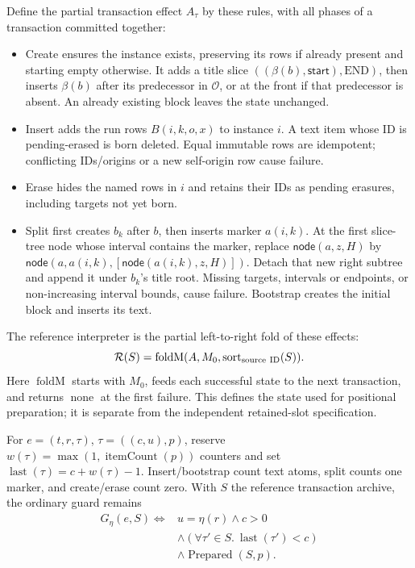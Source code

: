 Define the partial transaction effect $A_\tau$ by these rules, with all phases
of a transaction committed together:
\begin{itemize}
\item Create ensures the instance exists, preserving its rows if already
present and starting empty otherwise. It adds a title slice
  $((\beta(b),\mathsf{start}),\mathrm{END})$, then inserts $\beta(b)$ after its
  predecessor in $\mathcal O$, or at the front if that predecessor is absent.
  An already existing block leaves the state unchanged.
\item Insert adds the run rows $B(i,k,o,x)$ to instance $i$. A text item whose
  ID is pending-erased is born deleted. Equal immutable rows are idempotent;
  conflicting IDs/origins or a new self-origin row cause failure.
\item Erase hides the named rows in $i$ and retains their IDs as pending
  erasures, including targets not yet born.
\item Split first creates $b_k$ after $b$, then inserts marker $a(i,k)$.
  At the first slice-tree node whose interval contains the marker, replace
  $\mathsf{node}(a,z,H)$ by
  $\mathsf{node}(a,a(i,k),[\mathsf{node}(a(i,k),z,H)])$.
  Detach that new right subtree and append it under $b_k$'s title root.
  Missing targets, intervals or endpoints, or non-increasing interval bounds,
  cause failure. Bootstrap creates the initial block and inserts its text.
\end{itemize}
The reference interpreter is the partial left-to-right fold of these effects:
\[
\mathcal R(S)=\operatorname{foldM}
 (A,M_0,\operatorname{sort}_{\rm source\ ID}(S)).
\]
Here $\operatorname{foldM}$ starts with $M_0$, feeds each successful state to
the next transaction, and returns $\operatorname{none}$ at the first failure.
This defines the state used for positional preparation; it is separate from
the independent retained-slot specification.

For $e=(t,r,\tau)$, $\tau=((c,u),p)$, reserve $w(\tau)=\max(1,\operatorname{itemCount}(p))$ counters and set $\operatorname{last}(\tau)=c+w(\tau)-1$. Insert/bootstrap count text atoms, split counts one marker, and create/erase count zero. With $S$ the reference transaction archive, the ordinary guard remains
\[
\begin{aligned}
G_\eta(e,S)\iff{}&u=\eta(r)\land c>0\\
&\land(\forall\tau'\in S.\ \operatorname{last}(\tau')<c)\\
&\land\operatorname{Prepared}(S,p).
\end{aligned}
\]

